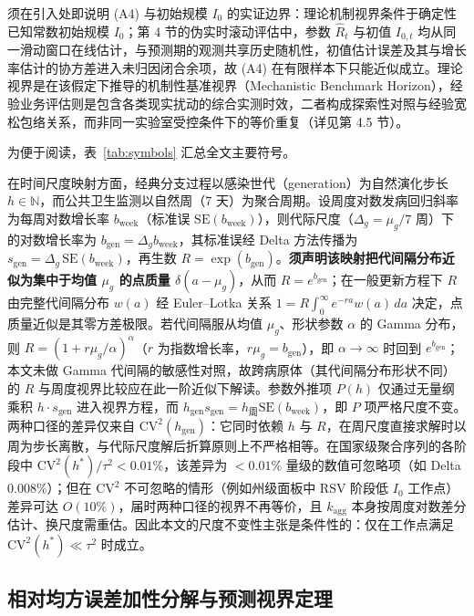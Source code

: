 \documentclass[11pt,a4paper]{article}
\theoremstyle{plain}
\theoremstyle{definition}
\begin{document}
须在引入处即说明 (A4) 与初始规模 $I_0$ 的实证边界：理论机制视界条件于确定性已知常数初始规模 $I_0$；第 4 节的伪实时滚动评估中，参数 $\hat{R}_t$ 与初值 $I_{0,t}$ 均从同一滑动窗口在线估计，与预测期的观测共享历史随机性，初值估计误差及其与增长率估计的协方差进入未归因闭合余项，故 (A4) 在有限样本下只能近似成立。理论视界是在该假定下推导的机制性基准视界（Mechanistic Benchmark Horizon），经验业务评估则是包含各类现实扰动的综合实测时效，二者构成探索性对照与经验宽松包络关系，而非同一实验室受控条件下的等价重复（详见第 4.5 节）。

为便于阅读，表~\ref{tab:symbols} 汇总全文主要符号。



在时间尺度映射方面，经典分支过程以感染世代（generation）为自然演化步长 $h \in \mathbb{N}$，而公共卫生监测以自然周（7 天）为聚合周期。设周度对数发病回归斜率为每周对数增长率 $b_{\text{week}}$（标准误 $\text{SE}(b_{\text{week}})$），则代际尺度（$\Delta_g = \mu_g/7$ 周）下的对数增长率为 $b_{\text{gen}} = \Delta_g b_{\text{week}}$，其标准误经 Delta 方法传播为 $s_{\text{gen}} = \Delta_g\,\text{SE}(b_{\text{week}})$，再生数 $R = \exp(b_{\text{gen}})$。\textbf{须声明该映射把代间隔分布近似为集中于均值 $\mu_g$ 的点质量 $\delta(a-\mu_g)$}，从而 $R = e^{b_{\text{gen}}}$；在一般更新方程下 $R$ 由完整代间隔分布 $w(a)$ 经 Euler--Lotka 关系 $1 = R\int_0^\infty e^{-ra}w(a)\,da$ 决定，点质量近似是其零方差极限。若代间隔服从均值 $\mu_g$、形状参数 $\alpha$ 的 Gamma 分布，则 $R = \left(1 + r\mu_g/\alpha\right)^{\alpha}$（$r$ 为指数增长率，$r\mu_g = b_{\text{gen}}$），即 $\alpha \to \infty$ 时回到 $e^{b_{\text{gen}}}$；本文未做 Gamma 代间隔的敏感性对照，故跨病原体（其代间隔分布形状不同）的 $R$ 与周度视界比较应在此一阶近似下解读。参数外推项 $P(h)$ 仅通过无量纲乘积 $h \cdot s_{\text{gen}}$ 进入视界方程，而 $h_{\text{gen}} s_{\text{gen}} = h_{\text{周}} \text{SE}(b_{\text{week}})$，即 $P$ 项严格尺度不变。两种口径的差异仅来自 $\text{CV}^2(h_{\text{gen}})$：它同时依赖 $h$ 与 $R$，在周尺度直接求解时以周为步长离散，与代际尺度解后折算原则上不严格相等。在国家级聚合序列的各阶段中 $\text{CV}^2(h^*)/\tau^2 < 0.01\%$，该差异为 $<0.01\%$ 量级的数值可忽略项（如 Delta 0.008\%）；但在 $\text{CV}^2$ 不可忽略的情形（例如州级面板中 RSV 阶段低 $I_0$ 工作点）差异可达 $O(10\%)$，届时两种口径的视界不再等价，且 $k_{\text{agg}}$ 本身按周度对数差分估计、换尺度需重估。因此本文的尺度不变性主张是条件性的：仅在工作点满足 $\text{CV}^2(h^*) \ll \tau^2$ 时成立。

\subsection{相对均方误差加性分解与预测视界定理}
\end{document}
